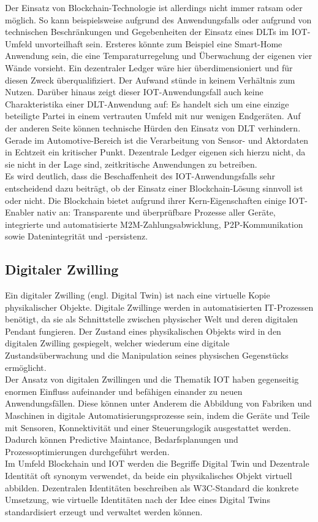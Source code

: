 Der Einsatz von Blockchain-Technologie ist allerdings nicht immer ratsam oder möglich. So kann beispielsweise aufgrund des Anwendungsfalls oder aufgrund von technischen Beschränkungen und Gegebenheiten der Einsatz eines \ac{DLT}s im \ac{IOT}-Umfeld unvorteilhaft sein. Ersteres könnte zum Beispiel eine Smart-Home Anwendung sein, die eine Temparaturregelung und Überwachung der eigenen vier Wände vorsieht. Ein dezentraler Ledger wäre hier überdimensioniert und für diesen Zweck überqualifiziert. Der Aufwand stünde in keinem Verhältnis zum Nutzen. Darüber hinaus zeigt dieser \ac{IOT}-Anwendungsfall auch keine Charakteristika einer \ac{DLT}-Anwendung auf: Es handelt sich um eine einzige beteiligte Partei in einem vertrauten Umfeld mit nur wenigen Endgeräten. Auf der anderen Seite können technische Hürden den Einsatz von \ac{DLT} verhindern. Gerade im Automotive-Bereich ist die Verarbeitung von Sensor- und Aktordaten in Echtzeit ein kritischer Punkt. Dezentrale Ledger eigenen sich hierzu nicht, da sie nicht in der Lage sind, zeitkritische Anwendungen zu betreiben.\\
Es wird deutlich, dass die Beschaffenheit des \ac{IOT}-Anwendungsfalls sehr entscheidend dazu beiträgt, ob der Einsatz einer Blockchain-Lösung sinnvoll ist oder nicht. Die Blockchain bietet aufgrund ihrer Kern-Eigenschaften einige IOT-Enabler nativ an: Transparente und überprüfbare Prozesse aller Geräte, integrierte und automatisierte \ac{M2M}-Zahlungsabwicklung, \ac{P2P}-Kommunikation sowie Datenintegrität und -persistenz.

\subsection{Digitaler Zwilling}
\label{subsec:fundamentals:iot:digitaltwins}
Ein digitaler Zwilling (engl. Digital Twin) ist nach \citeauthor{deloitte2018} eine virtuelle Kopie physikalischer Objekte. Digitale Zwillinge werden in automatisierten IT-Prozessen benötigt, da sie als Schnittstelle zwischen physischer Welt und deren digitalen Pendant fungieren. Der Zustand eines physikalischen Objekts wird in den digitalen Zwilling gespiegelt, welcher wiederum eine digitale Zustandsüberwachung und die Manipulation seines physischen Gegenstücks ermöglicht. \cite{deloitte2018}\\
Der Ansatz von digitalen Zwillingen und die Thematik \ac{IOT} haben gegenseitig enormen Einfluss aufeinander und befähigen einander zu neuen Anwendungsfällen. Diese können unter Anderem die Abbildung von Fabriken und Maschinen in digitale Automatisierungsprozesse sein, indem die Geräte und Teile mit Sensoren, Konnektivität und einer Steuerungslogik ausgestattet werden. Dadurch können Predictive Maintance, Bedarfsplanungen und Prozessoptimierungen durchgeführt werden.\\
Im Umfeld Blockchain und \ac{IOT} werden die Begriffe Digital Twin und Dezentrale Identität oft synonym verwendet, da beide ein physikalisches Objekt virtuell abbilden. Dezentralen Identitäten beschreiben als \ac{W3C}-Standard die konkrete Umsetzung, wie virtuelle Identitäten nach der Idee eines Digital Twins standardisiert erzeugt und verwaltet werden können.
